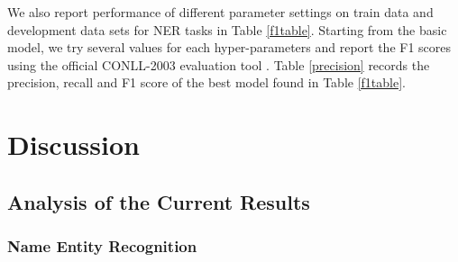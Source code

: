 \documentclass[11pt,a4paper]{article}
\begin{document}

We also report performance of different parameter settings on train data and development data sets for NER tasks in Table \ref{f1table}. Starting from the basic model, we try several values for each hyper-parameters and report the F1 scores using the official CONLL-2003 evaluation tool \cite{tjongkimsang2003conll}. Table \ref{precision} records the precision, recall and F1 score of the best model found in Table \ref{f1table}. 


\section{Discussion} \label{sec:discussion}%

\subsection{Analysis of the Current Results}
\subsubsection{Name Entity Recognition}
\end{document}
